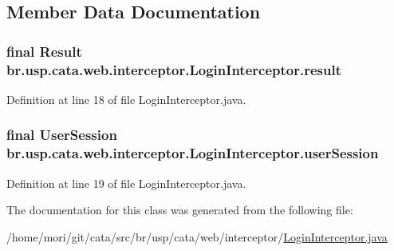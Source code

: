 \subsection{Member Data Documentation}
\hypertarget{classbr_1_1usp_1_1cata_1_1web_1_1interceptor_1_1_login_interceptor_abe28cfc61039e56a205ac98d49a76448}{
\subsubsection[{result}]{\setlength{\rightskip}{0pt plus 5cm}final Result br.\+usp.\+cata.\+web.\+interceptor.\+Login\+Interceptor.\+result\hspace{0.3cm}{\ttfamily [private]}}}\label{classbr_1_1usp_1_1cata_1_1web_1_1interceptor_1_1_login_interceptor_abe28cfc61039e56a205ac98d49a76448}


Definition at line 18 of file Login\+Interceptor.\+java.

\hypertarget{classbr_1_1usp_1_1cata_1_1web_1_1interceptor_1_1_login_interceptor_a01a6b4e07b71366d1e49a081bf90e70c}{
\subsubsection[{user\+Session}]{\setlength{\rightskip}{0pt plus 5cm}final {\bf User\+Session} br.\+usp.\+cata.\+web.\+interceptor.\+Login\+Interceptor.\+user\+Session\hspace{0.3cm}{\ttfamily [private]}}}\label{classbr_1_1usp_1_1cata_1_1web_1_1interceptor_1_1_login_interceptor_a01a6b4e07b71366d1e49a081bf90e70c}


Definition at line 19 of file Login\+Interceptor.\+java.



The documentation for this class was generated from the following file\+:\begin{DoxyCompactItemize}
\item 
/home/mori/git/cata/src/br/usp/cata/web/interceptor/\hyperlink{_login_interceptor_8java}{Login\+Interceptor.\+java}\end{DoxyCompactItemize}
